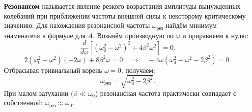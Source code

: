 \begin{property}
\textbf{Резонансом} называется явление резкого возрастания амплитуды вынужденных колебаний при приближении частоты внешней силы к некоторому критическому значению. Для нахождения резонансной частоты $\omega_{\text{рез}}$ найдём минимум знаменателя в формуле для $A$. Возьмём производную по $\omega$ и приравняем к нулю:
\begin{equation}
    \frac{d}{d\omega}\left[ (\omega_0^2 - \omega^2)^2 + 4\beta^2 \omega^2 \right] = 0.
\end{equation}
\begin{equation}
    2(\omega_0^2 - \omega^2)(-2\omega) + 8\beta^2 \omega = 0 \quad \Rightarrow \quad -4\omega(\omega_0^2 - \omega^2 - 2\beta^2) = 0.
\end{equation}
Отбрасывая тривиальный корень $\omega = 0$, получаем:
\begin{equation}
    \omega_{\text{рез}} = \sqrt{\omega_0^2 - 2\beta^2}. \label{eq:res_freq}
\end{equation}
При малом затухании ($\beta \ll \omega_0$) резонансная частота практически совпадает с собственной: $\omega_{\text{рез}} \approx \omega_0$.
\end{property}

